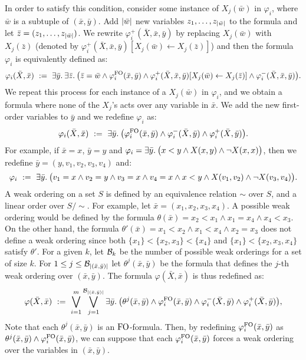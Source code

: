  In order to satisfy this condition, consider some instance of $X_j(\bar{w})$ in $\varphi_i$, where $\bar{w}$ is a subtuple of $(\bar{x},\bar{y})$. Add $\vert \bar{w} \vert$ new variables $z_1,\ldots,z_{\vert \bar{w} \vert}$ to the formula and let $\bar{z} = (z_1,\ldots,z_{\vert \bar{w} \vert})$. We rewrite $\varphi_i^{+}(\bar{X},\bar{x},\bar{y})$ by replacing $X_j(\bar{w})$ with $X_j(\bar{z})$ (denoted by $\varphi_i^{+}(\bar{X},\bar{x},\bar{y})[X_j(\bar{w}) \leftarrow X_j(\bar{z})]$) and then the formula $\varphi_i$ is equivalently defined as:
$$
\varphi_i(\bar{X},\bar{x}) \ := \ \exists{\bar{y}}.\: \exists{\bar{z}}.\: \big( \bar{z} = \bar{w} \wedge \varphi_i^{{\rm FO}}(\bar{x},\bar{y}) \wedge \varphi_i^{+}(\bar{X},\bar{x},\bar{y})[X_j(\bar{w}) \leftarrow X_j(\bar{z})] \wedge
\varphi_i^{-}(\bar{X},\bar{x},\bar{y}) \big).
$$
We repeat this process for each instance of a $X_j(\bar{w})$ in $\varphi_i$, and we obtain a formula where none of the $X_j$'s acts over any variable in $\bar{x}$. We add the new first-order variables to $\bar{y}$ and we redefine $\varphi_i$ as:
$$
\varphi_i(\bar{X},\bar{x}) \ := \  \exists{\bar{y}}.\: \big( \varphi_i^{{\rm FO}}(\bar{x},\bar{y}) \wedge \varphi_i^{-}(\bar{X},\bar{y}) \wedge \varphi_i^{+}(\bar{X},\bar{y})\big).
$$
For example, if $\bar{x} = x$, $\bar{y} = y$ and $\varphi_i = \exists{\bar{y}}.\: \big( x < y \wedge  X(x,y)\wedge \neg X(x,x)\big)$, then we redefine $\bar{y} = (y,v_1,v_2,v_3,v_4)$ and:
$$
\varphi_i \ := \ \exists{\bar{y}}.\:\big( v_1 = x \wedge v_2 = y \wedge v_3 = x \wedge v_4 = x \wedge x < y  \wedge  X(v_1,v_2) \wedge \neg X(v_3,v_4)\big).
$$
 A weak ordering on a set $S$ is defined by an equivalence relation $\sim$ over $S$, and a linear order over $S/\!\sim$. For example, let $\bar{x} = (x_1,x_2,x_3,x_4)$. A possible weak ordering would be defined by the formula $\theta(\bar{x}) = x_2 < x_1 \wedge x_1 = x_4 \wedge x_4 < x_3$. On the other hand, the formula $\theta'(\bar{x}) = x_1 < x_2 \wedge x_1 < x_4 \wedge x_2 = x_3$ does not define a weak ordering since both $\{x_1\}<\{x_2,x_3\}<\{x_4\}$ and $\{x_1\} < \{x_2,x_3,x_4\}$ satisfy $\theta'$.
For a given $k$, let $\mathcal{B}_k$ be the number of possible weak orderings for a set of size $k$. For $1 \leq j \leq \mathcal{B}_{\vert (\bar{x},\bar{y}) \vert}$ 
let $\theta^j(\bar{x},\bar{y})$ be the formula that defines the $j$-th weak ordering over $(\bar{x},\bar{y})$. 
The formula $\varphi(\bar{X},\bar{x})$ is thus redefined as:
$$
\varphi(\bar{X},\bar{x}) \ := \ \bigvee_{i = 1}^m \bigvee_{j = 1}^{\mathcal{B}_{\vert (\bar{x},\bar{y}) \vert}} \exists{\bar{y}}.\: \big(\theta^j(\bar{x},\bar{y})\wedge \varphi_i^{{\rm FO}}(\bar{x},\bar{y}) \wedge \varphi_i^{-}(\bar{X},\bar{y}) \wedge \varphi_i^{+}(\bar{X},\bar{y})\big),
$$
Note that each $\theta^j(\bar{x},\bar{y})$ is an ${\rm FO}$-formula.
Then, by redefining $\varphi_i^{{\rm FO}}(\bar{x},\bar{y})$  as $\theta^j(\bar{x},\bar{y})\wedge \varphi_i^{{\rm FO}}(\bar{x},\bar{y})$, we can suppose that each $\varphi_i^{{\rm FO}}(\bar{x},\bar{y})$ forces a weak ordering over the variables in $(\bar{x},\bar{y})$.

